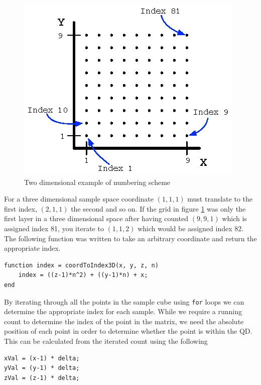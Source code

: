\documentclass[authoryearcitations]{UoYCSproject}
\begin{document}
\begin{figure}[h!]
  \centering
  \includegraphics[scale=1.5]{figures/indexNumbering.eps}
  \caption{Two dimensional example of numbering scheme}
\label{indexNum}
\end{figure}

For a three dimensional sample space coordinate $(1,1,1)$ must translate to the first index, 
$(2,1,1)$ the second and so on. If the grid in figure \ref{indexNum} was only the first layer in a three dimensional 
space after having counted $(9,9,1)$ which is assigned index 81, you iterate to $(1,1,2)$ which would be assigned index 82.
The following function was written to take an arbitrary coordinate and return the appropriate index.
 
\begin{lstlisting}[caption={Index value from sample point},
label=lst:coordToIndex]
function index = coordToIndex3D(x, y, z, n)
    index = ((z-1)*n^2) + ((y-1)*n) + x;
end
\end{lstlisting}

By iterating through all the points in the sample cube using \verb+for+ loops we can determine the appropriate index
for each sample. While we require a running count to determine the index of the point in the matrix, 
we need the absolute position of each
point in order to determine whether the point is within the QD. This can be calculated from the iterated count
using the following

\begin{lstlisting}[caption={Finding the absolute coordinates}, label=absoluteCoord, firstnumber=16]
xVal = (x-1) * delta;
yVal = (y-1) * delta;
zVal = (z-1) * delta;
\end{lstlisting}
\end{document}

